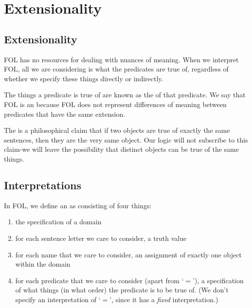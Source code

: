 %
%
%
\chapter{Extensionality}
\label{Ext} %

\section{ Extensionality}

\begin{remark}
    FOL has no resources for dealing with nuances of meaning. When we interpret FOL, all we are considering is what the predicates are true of, regardless of whether we specify these things directly or indirectly.
\end{remark}


\begin{definition}
    The things a predicate is true of are known as the  of that predicate. We say that FOL is an  because FOL does not represent differences of meaning between predicates that have the same extension.
\end{definition}

\begin{remark}
    The  is a philosophical claim that if two objects are true of exactly the same sentences, then they are the very same object. Our logic will not subscribe to this claim-we will leave the possibility that distinct objects can be true of the same things.
\end{remark}


\section{ Interpretations}

\begin{definition}
    In FOL, we define an  as consisting of four things: \begin{enumerate}
        \item the specification of a domain
        \item for each sentence letter we care to consider, a truth value
        \item for each name that we care to consider, an assignment of exactly one object within the domain
        \item for each predicate that we care to consider (apart from `$=$'), a specification of what things (in what order) the predicate is to be true of. (We don't specify an interpretation of `$=$', since it has a \emph{fixed} interpretation.)
    \end{enumerate}
\end{definition}


